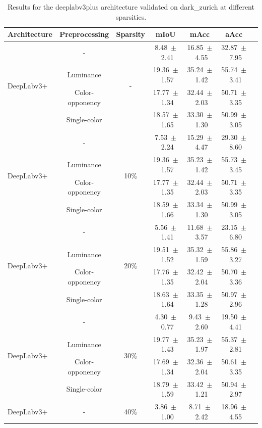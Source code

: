 \begin{table}[h]
\centering
\caption{Results for the deeplabv3plus architecture validated on dark_zurich at different sparsities.}
\begin{tabular}{@{}lccc ccc@{}}
\toprule
Architecture & Preprocessing & Sparsity & mIoU & mAcc & aAcc \\
\midrule

\multirow{4}{*}{DeepLabv3+} & - & \multirow{4}{*}{-} & 8.48~$\pm$~2.41 & 16.85~$\pm$~4.55 & 32.87~$\pm$~7.95 \\
& Luminance & & 19.36~$\pm$~1.57 & 35.24~$\pm$~1.42 & 55.74~$\pm$~3.41 \\
& Color-opponency & & 17.77~$\pm$~1.34 & 32.44~$\pm$~2.03 & 50.71~$\pm$~3.35 \\
& Single-color & & 18.57~$\pm$~1.65 & 33.30~$\pm$~1.30 & 50.99~$\pm$~3.05 \\
\midrule
\multirow{4}{*}{DeepLabv3+} & - & \multirow{4}{*}{10\%} & 7.53~$\pm$~2.24 & 15.29~$\pm$~4.47 & 29.30~$\pm$~8.60 \\
& Luminance & & 19.36~$\pm$~1.57 & 35.23~$\pm$~1.42 & 55.73~$\pm$~3.45 \\
& Color-opponency & & 17.77~$\pm$~1.35 & 32.44~$\pm$~2.03 & 50.71~$\pm$~3.35 \\
& Single-color & & 18.59~$\pm$~1.66 & 33.34~$\pm$~1.30 & 50.99~$\pm$~3.05 \\
\midrule
\multirow{4}{*}{DeepLabv3+} & - & \multirow{4}{*}{20\%} & 5.56~$\pm$~1.41 & 11.68~$\pm$~3.57 & 23.15~$\pm$~6.80 \\
& Luminance & & 19.51~$\pm$~1.52 & 35.32~$\pm$~1.59 & 55.86~$\pm$~3.27 \\
& Color-opponency & & 17.76~$\pm$~1.35 & 32.42~$\pm$~2.04 & 50.70~$\pm$~3.36 \\
& Single-color & & 18.63~$\pm$~1.64 & 33.35~$\pm$~1.28 & 50.97~$\pm$~2.96 \\
\midrule
\multirow{4}{*}{DeepLabv3+} & - & \multirow{4}{*}{30\%} & 4.30~$\pm$~0.77 & 9.43~$\pm$~2.60 & 19.50~$\pm$~4.41 \\
& Luminance & & 19.77~$\pm$~1.43 & 35.23~$\pm$~1.97 & 55.37~$\pm$~2.81 \\
& Color-opponency & & 17.69~$\pm$~1.34 & 32.36~$\pm$~2.04 & 50.61~$\pm$~3.35 \\
& Single-color & & 18.79~$\pm$~1.59 & 33.42~$\pm$~1.21 & 50.94~$\pm$~2.97 \\
\midrule
\multirow{4}{*}{DeepLabv3+} & - & \multirow{4}{*}{40\%} & 3.86~$\pm$~1.00 & 8.71~$\pm$~2.42 & 18.96~$\pm$~4.55 \\

\end{tabular}
\end{table}
